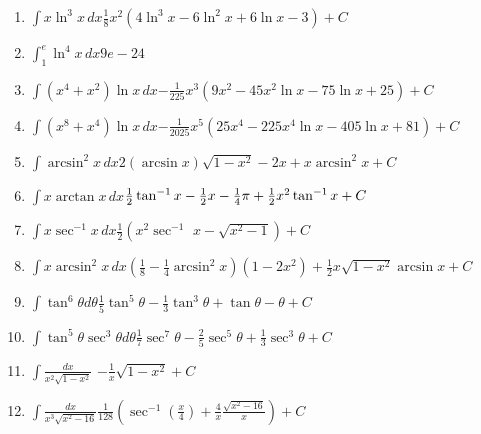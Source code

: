 {\begin{enumerate}
\item {$\displaystyle{\int x\ln ^{3}x\, dx}$}{$\frac{1}{8}x^{2}\left( 4\ln ^{3}x-6\ln ^{2}x+6\ln x-3\right)+C $}

\item {$\displaystyle{\int_{1}^{e}\ln ^{4}x\, dx}$}{$\allowbreak 9e-24$ }

\item {$\displaystyle{\int \left( x^{4}+x^{2}\right) \ln x\, dx}$}{\linebreak$-\frac{1}{225}%
x^{3}\left( 9x^{2}-45x^{2}\ln x-75\ln x+25\right)+C $}

\item {$\displaystyle{\int \left( x^{8}+x^{4}\right) \ln x\, dx}$}{$-\frac{1}{2025}x^{5}\left(25x^{4}-225x^{4}\ln x-405\ln x+81\right)+C $}

\item {$\displaystyle{\int \arcsin^{2}x\, dx}$}{\linebreak $2\left(\arcsin x\right) \sqrt{1-x^{2}}-2x+x\arcsin ^{2}x+C$ }

\item {$\displaystyle{\int x\arctan x\, dx}$}{$ \frac{1}{2}\tan^{-1} x-\frac{1}{2}x-\frac{1}{%
4}\pi +\frac{1}{2}x^{2}\tan^{-1} x+C $}

\item {$\displaystyle{\int x\sec^{-1} x\, dx}$}{$\frac{1}{2}\left(x^{2}\sec^{-1}\right.$ \linebreak $\left. x-%
\sqrt{x^{2}-1}\right)+C$ }

\item {$\displaystyle{\int x\arcsin ^{2}x\, dx}$}{$\left( \frac{1}{8}-\frac{1}{4}\arcsin ^{2}x\right)\left( 1-2x^{2}\right) +\frac{1}{2}x\sqrt{1-x^{2}}\arcsin x+C $}

\item {$\displaystyle{\int \tan ^{6}\theta d\theta }$}{$\frac{1}{5}\tan ^{5}\theta -\frac{1}{3}\tan ^{3}\theta +\tan \theta -\theta+C $}

\item {$\displaystyle{\int \tan ^{5}\theta \sec ^{3}\theta d\theta }$}{$\frac{1}{7}\sec ^{7}\theta
-\frac{2}{5}\sec ^{5}\theta +\frac{1}{3}\sec ^{3}\theta+C $}

\item {$\displaystyle{\int \frac{dx}{x^{2}\sqrt{1-x^{2}}}}$}{ $-\frac{1}{x}\sqrt{1-x^{2}}+C$}

\item {$\displaystyle{\int \frac{dx}{x^{3}\sqrt{x^{2}-16}}}$}{$\frac{1}{128}\left( \sec^{-1}\left( \frac{x}{4}\right) +\frac{4}{x}\frac{\sqrt{x^{2}-16}}{x}\right) +C$ }


\end{enumerate}}
